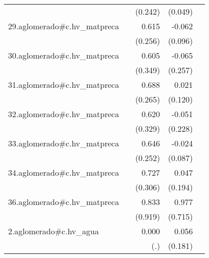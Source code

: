 {\begin{longtable}{l*{4}{D{.}{.}{-1}}}
            &                     &     (0.242)         &     (0.049)         &                     \\
\addlinespace
29.aglomerado#c.hv\_matpreca&                     &       0.615\sym{*}  &      -0.062         &                     \\
            &                     &     (0.256)         &     (0.096)         &                     \\
\addlinespace
30.aglomerado#c.hv\_matpreca&                     &       0.605         &      -0.065         &                     \\
            &                     &     (0.349)         &     (0.257)         &                     \\
\addlinespace
31.aglomerado#c.hv\_matpreca&                     &       0.688\sym{**} &       0.021         &                     \\
            &                     &     (0.265)         &     (0.120)         &                     \\
\addlinespace
32.aglomerado#c.hv\_matpreca&                     &       0.620         &      -0.051         &                     \\
            &                     &     (0.329)         &     (0.228)         &                     \\
\addlinespace
33.aglomerado#c.hv\_matpreca&                     &       0.646\sym{*}  &      -0.024         &                     \\
            &                     &     (0.252)         &     (0.087)         &                     \\
\addlinespace
34.aglomerado#c.hv\_matpreca&                     &       0.727\sym{*}  &       0.047         &                     \\
            &                     &     (0.306)         &     (0.194)         &                     \\
\addlinespace
36.aglomerado#c.hv\_matpreca&                     &       0.833         &       0.977         &                     \\
            &                     &     (0.919)         &     (0.715)         &                     \\
\addlinespace
2.aglomerado#c.hv\_agua&                     &       0.000         &       0.056         &                     \\
            &                     &         (.)         &     (0.181)         &                     \\

\end{longtable}}
